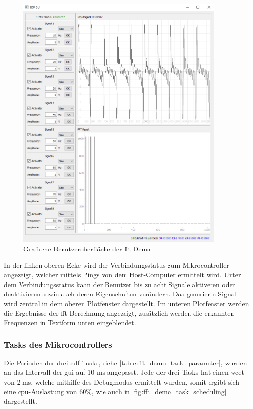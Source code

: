 \documentclass[../EDF Master Thesis.tex]{subfiles}
\begin{document}
            \begin{figure}[H]
                \centering
                \includegraphics[width=0.92\textwidth]{./attachments/gui.png}
                \caption{Grafische Benutzeroberfläche der \ac{fft}-Demo}
                \label{fig:grafische_benutzeroberflaeche}
            \end{figure}

        In der linken oberen Ecke wird der Verbindungsstatus zum Mikrocontroller angezeigt, welcher mittels Pings von dem Host-Computer ermittelt wird.
        Unter dem Verbindungsstatus kann der Benutzer bis zu acht Signale aktiveren oder deaktivieren sowie auch deren Eigenschaften verändern.
        Das generierte Signal wird zentral in dem oberen Plotfenster dargestellt.
        Im unteren Plotfenster werden die Ergebnisse der \ac{fft}-Berechnung angezeigt, zusätzlich werden die erkannten Frequenzen in Textform unten eingeblendet.

        \subsubsection{Tasks des Mikrocontrollers}
            Die Perioden der drei \ac{edf}-Tasks, siehe \autoref{table:fft_demo_task_parameter}, wurden an das Intervall der \ac{gui} auf 10 ms angepasst.
            Jede der drei Tasks hat einen \ac{wcet} von 2 ms, welche mithilfe des Debugmodus ermittelt wurden, somit ergibt sich eine \ac{cpu}-Auslastung von 60\%, wie auch in \autoref{fig:fft_demo_task_scheduling} dargestellt.
\end{document}
